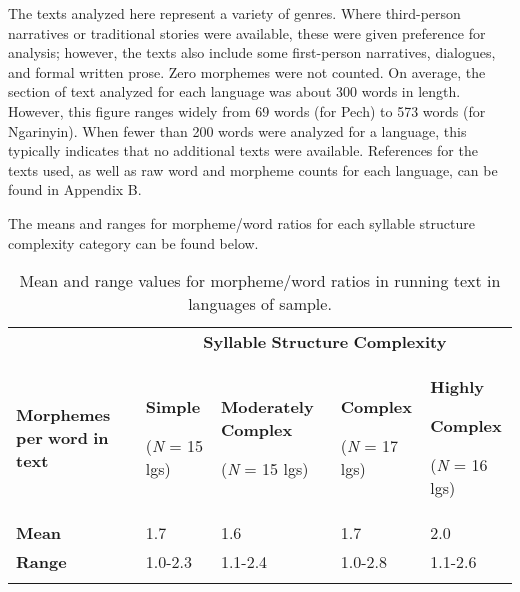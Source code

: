   The texts analyzed here represent a variety of genres. Where third-person narratives or traditional stories were available, these were given preference for analysis; however, the texts also include some first-person narratives, dialogues, and formal written prose. Zero morphemes were not counted. On average, the section of text analyzed for each language was about 300 words in length. However, this figure ranges widely from 69 words (for Pech) to 573 words (for Ngarinyin). When fewer than 200 words were analyzed for a language, this typically indicates that no additional texts were available. References for the texts used, as well as raw word and morpheme counts for each language, can be found in Appendix B.



  The means and ranges for morpheme/word ratios for each syllable structure complexity category can be found below.






\begin{table}
\begin{tabularx}{\textwidth}{XXXXX}
\lsptoprule
 & \multicolumn{4}{c}{ \textbf{Syllable} \textbf{Structure} \textbf{Complexity}}\\
 \textbf{Morphemes} \textbf{per} \textbf{word} \textbf{in} \textbf{text} & { \textbf{Simple}}

 (\textit{N} = 15 lgs) & { \textbf{Moderately} \textbf{Complex}}

 (\textit{N} = 15 lgs) & { \textbf{Complex}}

 (\textit{N} = 17 lgs) & { \textbf{Highly} }

{ \textbf{Complex}}

 (\textit{N} = 16 lgs)\\
 \textbf{Mean} & 1.7 & 1.6 & 1.7 & 2.0\\
 \textbf{Range} & 1.0-2.3 & 1.1-2.4 & 1.0-2.8 & 1.1-2.6\\
\lspbottomrule
\end{tabularx}
\caption{\label{8.1}Mean and range values for morpheme/word ratios in running text in languages of sample.}
\end{table}




